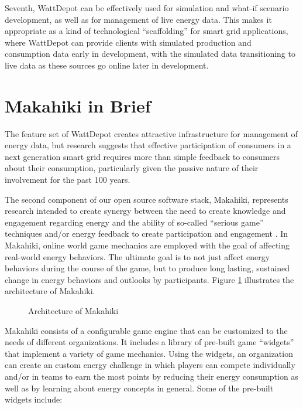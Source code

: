 \documentclass{acm_proc_article-sp}
\begin{document}
Seventh, WattDepot can be effectively used for simulation and what-if scenario
development, as well as for management of live energy data.  This makes it appropriate as
a kind of technological ``scaffolding'' for smart grid applications, where WattDepot can
provide clients with simulated production and consumption data early in development, with
the simulated data transitioning to live data as these sources go online later in development.

\section{Makahiki in Brief}

The feature set of WattDepot creates attractive infrastructure for management of energy
data, but research suggests that effective participation of consumers in a next generation
smart grid requires more than simple feedback to consumers about their consumption,
particularly given the passive nature of their involvement for the past 100 years. 

The second component of our open source software stack, Makahiki, represents research
intended to create synergy between the need to create knowledge and engagement regarding
energy and the ability of so-called ``serious game'' techniques and/or energy feedback to
create participation and engagement \cite{Deterding2011mt,darby-review-2006,Faruqui09,petersen-dorm-energy-reduction}.
In Makahiki, online world game mechanics are employed with the goal of affecting
real-world energy behaviors.  The ultimate goal is to not just affect energy behaviors
during the course of the game, but to produce long lasting, sustained change in energy
behaviors and outlooks by participants. Figure \ref{fig:makahiki-architecture} illustrates
the architecture of Makahiki.

\begin{figure}
\begin{center}
\end{center}
\caption{Architecture of Makahiki}
\label{fig:makahiki-architecture}
\end{figure}

Makahiki consists of a configurable game engine that can be customized to the needs of
different organizations.  It includes a library of pre-built game ``widgets'' that
implement a variety of game mechanics.  Using the widgets, an organization can create an
custom energy challenge in which players can compete individually and/or in teams to earn
the most points by reducing their energy consumption as well as by learning about energy
concepts in general.  Some of the pre-built widgets include:
\end{document}
